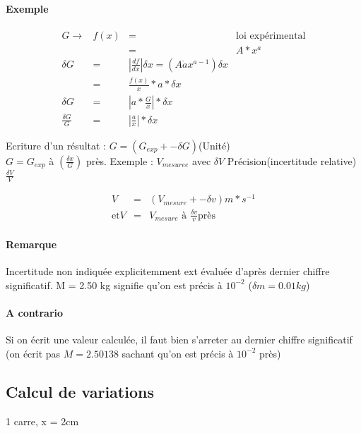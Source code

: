 \paragraph{Exemple}
\begin{align*}
	G \rightarrow & f(x) & = & \text{loi expérimental} \\
				  &  & = &A*x^a \\
	\delta G & = & |\frac{df}{dx}|\delta x = (A \dot ax^{a-1}) \delta x \\
							   & = & \frac{f(x)}{x} * a * \delta x\\
	\delta G & = & |a*\frac{G}{x}| * \delta x \\
	\frac{\delta G}{G} & = & |\frac{a}{x}| * \delta x
\end{align*}

Ecriture d'un résultat : $G = (G_{exp} +- \delta G)$(Unité) ~\\
$G = G_{exp} $ à $(\frac{\delta x}{G})$ près.
Exemple :
$V_{mesuree}$ avec $\delta V $
Précision(incertitude relative) $\frac{\delta V}{V}$

\begin{align*}
	V & = & (V_{mesure} +- \delta v) m * s^{-1} \\
	\text{et} V & = & V_{mesure} \text{ à } \frac{\delta v}{v} \text{près}
\end{align*}

\paragraph{Remarque}
Incertitude non indiquée explicitemment ext évaluée d'après dernier chiffre significatif.
M = 2.50 kg signifie qu'on est précis à $10^{-2}$ ($\delta m = 0.01 kg$)

\paragraph{A contrario} Si on écrit une valeur calculée, il faut bien s'arreter au dernier chiffre significatif (on écrit pas $M=2.50138$ sachant qu'on est précis à $10^{-2}$ près)

\subsection{Calcul de variations}

1 carre, x = 2cm 

